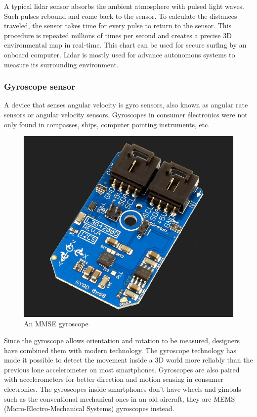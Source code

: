 A typical lidar sensor absorbs the ambient atmosphere with pulsed light waves. Such pulses rebound and come back to the sensor. To calculate the distances traveled, the sensor takes time for every pulse to return to the sensor. This procedure is repeated millions of times per second and creates a precise 3D environmental map in real-time. This chart can be used for secure surfing by an onboard computer.
Lidar is mostly used for advance autonomous systems to measure its surrounding environment.


\subsubsection{Gyroscope sensor}


A device that senses angular velocity is gyro sensors, also known as angular rate sensors or angular velocity sensors.  Gyroscopes in consumer électronics were not only found in compasses, ships, computer pointing instruments, etc.

\begin{figure}[h]
  \centering
    \includegraphics[width=0.5\linewidth]{figures/gyroSensor.png}
    \caption{An MMSE gyroscope}
\label{fig:gyroSensor}
\end{figure}

Since the gyroscope allows orientation and rotation to be measured, designers have combined them with modern technology. The gyroscope technology has made it possible to detect the movement inside a 3D world more reliably than the previous lone accelerometer on most smartphones. Gyroscopes are also paired with accelerometers for better direction and motion sensing in consumer electronics. The gyroscopes inside smartphones don't have wheels and gimbals such as the conventional mechanical ones in an old aircraft, they are MEMS (Micro-Electro-Mechanical Systems)  gyroscopes instead.



